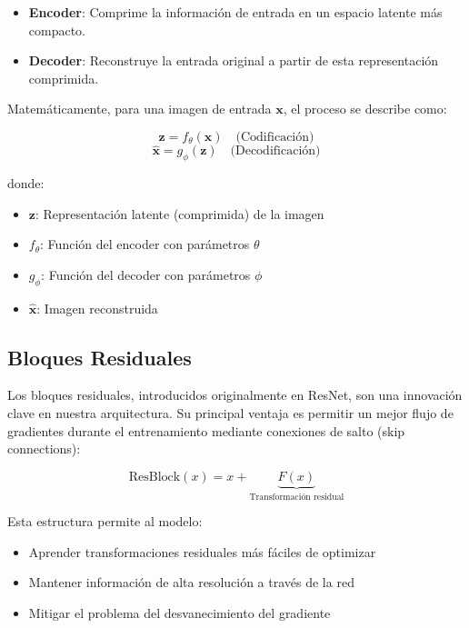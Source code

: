 \documentclass[conference]{IEEEtran}
\begin{document}
\begin{itemize}
    \item \textbf{Encoder}: Comprime la información de entrada en un espacio latente más compacto.
    \item \textbf{Decoder}: Reconstruye la entrada original a partir de esta representación comprimida.
\end{itemize}

Matemáticamente, para una imagen de entrada \(\mathbf{x}\), el proceso se describe como:

\begin{equation}
\mathbf{z} = f_{\theta}(\mathbf{x}) \quad \text{(Codificación)}
\end{equation}
\begin{equation}
\hat{\mathbf{x}} = g_{\phi}(\mathbf{z}) \quad \text{(Decodificación)}
\end{equation}

donde:
\begin{itemize}
    \item \(\mathbf{z}\): Representación latente (comprimida) de la imagen
    \item \(f_{\theta}\): Función del encoder con parámetros \(\theta\)
    \item \(g_{\phi}\): Función del decoder con parámetros \(\phi\)
    \item \(\hat{\mathbf{x}}\): Imagen reconstruida
\end{itemize}

\subsection{Bloques Residuales}
Los bloques residuales, introducidos originalmente en ResNet, son una innovación clave en nuestra arquitectura. Su principal ventaja es permitir un mejor flujo de gradientes durante el entrenamiento mediante conexiones de salto (skip connections):

\begin{equation}
\text{ResBlock}(x) = x + \underbrace{F(x)}_{\text{Transformación residual}}
\end{equation}

Esta estructura permite al modelo:
\begin{itemize}
    \item Aprender transformaciones residuales más fáciles de optimizar
    \item Mantener información de alta resolución a través de la red
    \item Mitigar el problema del desvanecimiento del gradiente
\end{itemize}
\end{document}
